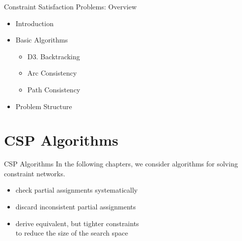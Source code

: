 


\subtitle{Constraint Satisfaction Problems: Backtracking}
\date{April 10, 2024}

\usetikzlibrary{automata}
\usetikzlibrary{shapes}
\usetikzlibrary{snakes}



\begin{frame}{Constraint Satisfaction Problems: Overview}
  \begin{itemize}
  \item {} Introduction
  \item {} Basic Algorithms
    \begin{itemize}
    \item \alert{D3. Backtracking}
    \item {} Arc Consistency
    \item {} Path Consistency
    \end{itemize}
  \item {} Problem Structure
  \end{itemize}
\end{frame}

\section{CSP Algorithms}

\begin{frame}{CSP Algorithms}
  In the following chapters, we consider \alert{algorithms for
    solving} \\ constraint networks.

  \medskip

  \begin{itemize}
    \item {} check partial assignments systematically
    \item {} discard inconsistent partial
    assignments
    \item {} derive equivalent, but tighter
    constraints \\ to reduce the size of the search space
  \end{itemize}

\end{frame}

